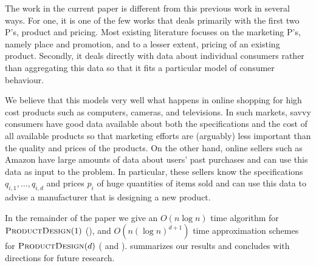 \documentclass[lotsofwhite]{patmorin}
\begin{document}

The work in the current paper is different from this previous work in
several ways.  For one, it is one of the few works that deals primarily
with the first two P's, product and pricing.  Most existing literature
focuses on the marketing P's, namely place and promotion, and to a lesser
extent, pricing of an existing product.  Secondly, it deals directly
with data about individual consumers rather than aggregating this data
so that it fits a particular model of consumer behaviour.

We believe that this models very well what happens in online shopping
for high cost products such as computers, cameras, and televisions.
In such markets, savvy consumers have good data available about both the
specifications and the cost of all available products so that marketing
efforts are (arguably) less important than the quality and prices of the
products. On the other hand, online sellers such as Amazon have large
amounts of data about users' past purchases and can use this data as input
to the problem.  In particular, these sellers know the specifications
$q_{i,1},\ldots,q_{i,d}$ and prices $p_i$ of huge quantities of items
sold and can use this data to advise a manufacturer that is designing
a new product.

In the remainder of the paper we give an $O(n\log n)$ time algorithm for
$\textsc{ProductDesign}(1)$ (), and $O(n(\log n)^{d+1})$ time
approximation schemes for $\textsc{ProductDesign}(d)$ (
and ).   summarizes our results and
concludes with directions for future research.
\end{document}
